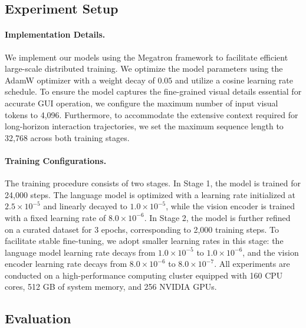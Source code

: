 \documentclass{llmxive}
\begin{document}
\subsection{Experiment Setup}

\paragraph{Implementation Details.} We implement our models using the Megatron framework to facilitate efficient large-scale distributed training. We optimize the model parameters using the AdamW optimizer with a weight decay of $0.05$ and utilize a cosine learning rate schedule. To ensure the model captures the fine-grained visual details essential for accurate GUI operation, we configure the maximum number of input visual tokens to 4,096. Furthermore, to accommodate the extensive context required for long-horizon interaction trajectories, we set the maximum sequence length to 32,768 across both training stages.

\paragraph{Training Configurations.} The training procedure consists of two stages. In Stage 1, the model is trained for 24,000 steps. The language model is optimized with a learning rate initialized at $2.5 \times 10^{-5}$ and linearly decayed to $1.0 \times 10^{-5}$, while the vision encoder is trained with a fixed learning rate of $8.0 \times 10^{-6}$.
In Stage 2, the model is further refined on a curated dataset for 3 epochs, corresponding to 2,000 training steps. To facilitate stable fine-tuning, we adopt smaller learning rates in this stage: the language model learning rate decays from $1.0 \times 10^{-5}$ to $1.0 \times 10^{-6}$, and the vision encoder learning rate decays from $8.0 \times 10^{-6}$ to $8.0 \times 10^{-7}$.
All experiments are conducted on a high-performance computing cluster equipped with 160 CPU cores, 512 GB of system memory, and 256 NVIDIA GPUs.

\subsection{Evaluation}
\end{document}
